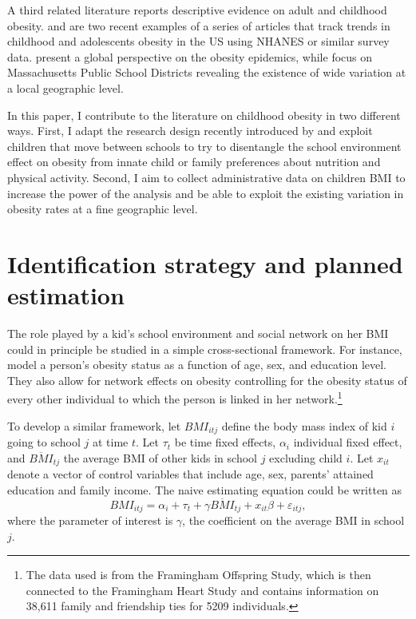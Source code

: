\documentclass[twoside,12pt]{article}
\begin{document}
A third related literature reports descriptive evidence on adult and childhood obesity. \cite{ogden2016trends} and \cite{iannotti2013trends} are two recent examples of a series of articles that track trends in childhood and adolescents obesity in the US using NHANES or similar survey data. \cite{ng2014global} present a global perspective on the obesity epidemics, while \cite{li2015declining} focus on Massachusetts Public School Districts revealing the existence of wide variation at a local geographic level.

In this paper, I contribute to the literature on childhood obesity in two different ways. First, I adapt the research design recently introduced by \cite{finkelstein2016sources} and exploit children that move between schools to try to disentangle the school environment effect on obesity from innate child or family preferences about nutrition and physical activity. Second, I aim to collect administrative data on children BMI to increase the power of the analysis and be able to exploit the existing variation in obesity rates at a fine geographic level.

\section{Identification strategy and planned estimation}
\label{identification}
The role played by a kid's school environment and social network on her BMI could in principle be studied in a simple cross-sectional framework. For instance, \cite{christakis2007spread} model a person's obesity status as a function of age, sex, and education level. They also allow for network effects on obesity controlling for the obesity status of every other individual to which the person is linked in her network.\footnote{The data used is from the Framingham Offspring Study, which is then connected to the Framingham Heart Study and contains information on 38,611 family and friendship ties for 5209 individuals.} 

To develop a similar framework, let $BMI_{itj}$ define the body mass index of kid $i$ going to school $j$ at time $t$. Let $\tau_t$ be time fixed effects, $\alpha_i$ individual fixed effect, and $\overline{BMI}_{tj}$ the average BMI of other kids in school $j$ excluding child $i$. Let $x_{it}$ denote a vector of control variables that include age, sex, parents' attained education and family income. The naive estimating equation could be written as
\begin{equation}\label{naive}
BMI_{itj} = \alpha_i + \tau_t + \gamma \overline{BMI}_{tj} + x_{it} \beta + \varepsilon_{itj},
\end{equation}
where the parameter of interest is $\gamma$, the coefficient on the average BMI in school $j$.
\end{document}
